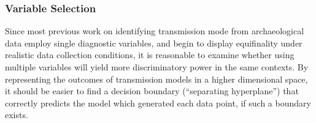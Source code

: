 \documentclass[10pt,letterpaper]{article}
\begin{document}
\subsubsection{Variable Selection}\label{variable-selection}

Since most previous work on identifying transmission mode from archaeological data employ single diagnostic variables, and begin to display equifinality under realistic data collection conditions, it is reasonable to examine whether using multiple variables will yield more discriminatory power in the same contexts.  By representing the outcomes of transmission models in a higher dimensional space, it should be easier to find a decision boundary (``separating hyperplane'') that correctly predicts the model which generated each data point, if such a boundary exists.  
\end{document}
